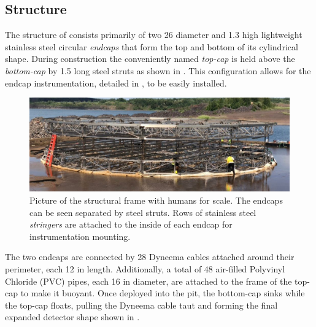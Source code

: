 \subsection{Structure} %
\label{sec:chips_detector_structure} %

The structure of \chipsfive consists primarily of two \SI{26}{} diameter and
\SI{1.3}{} high lightweight stainless steel circular \emph{endcaps} that form the top and
bottom of its cylindrical shape. During construction the conveniently named \emph{top-cap} is held
above the \emph{bottom-cap} by \SI{1.5}{} long steel struts as shown in
. This configuration allows for the endcap instrumentation, detailed in
, to be easily installed.

\begin{figure} %
    \includegraphics[width=\textwidth]{diagrams/4-chips/frame.pdf}
    \caption[Picture of the \chipsfive structural frame]
    {Picture of the \chipsfive structural frame with humans for scale. The endcaps can be seen
        separated by steel struts. Rows of stainless steel \emph{stringers} are attached to the
        inside of each endcap for instrumentation mounting.}
    \label{fig:frame}
\end{figure}

The two endcaps are connected by 28 Dyneema cables attached around their perimeter, each
\SI{12}{} in length. Additionally, a total of 48 air-filled Polyvinyl Chloride (PVC)
pipes, each \SI{16}{} in diameter, are attached to the frame of the top-cap to make
it buoyant. Once deployed into the pit, the bottom-cap sinks while the top-cap floats, pulling the
Dyneema cable taut and forming the final expanded detector shape shown in
.

